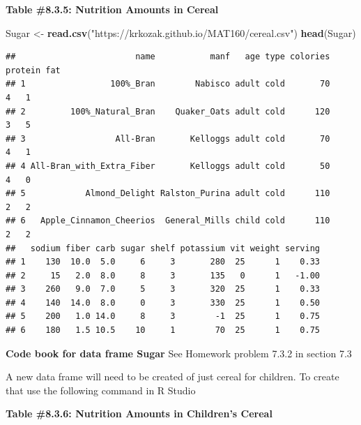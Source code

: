 \documentclass[]{book}
\newenvironment{Shaded}{\begin{snugshade}}{\end{snugshade}}
\newcommand{\KeywordTok}[1]{\textcolor[rgb]{0.13,0.29,0.53}{\textbf{#1}}}
\newcommand{\NormalTok}[1]{#1}
\newcommand{\OperatorTok}[1]{\textcolor[rgb]{0.81,0.36,0.00}{\textbf{#1}}}
\newcommand{\StringTok}[1]{\textcolor[rgb]{0.31,0.60,0.02}{#1}}
\begin{document}
\textbf{Table \#8.3.5: Nutrition Amounts in Cereal}

\begin{Shaded}
\begin{Highlighting}[]
\NormalTok{Sugar <-}\StringTok{ }\KeywordTok{read.csv}\NormalTok{(}\StringTok{"https://krkozak.github.io/MAT160/cereal.csv"}\NormalTok{)}
\KeywordTok{head}\NormalTok{(Sugar)}
\end{Highlighting}
\end{Shaded}

\begin{verbatim}
##                        name           manf   age type colories protein fat
## 1                 100%_Bran        Nabisco adult cold       70       4   1
## 2         100%_Natural_Bran    Quaker_Oats adult cold      120       3   5
## 3                  All-Bran       Kelloggs adult cold       70       4   1
## 4 All-Bran_with_Extra_Fiber       Kelloggs adult cold       50       4   0
## 5            Almond_Delight Ralston_Purina adult cold      110       2   2
## 6   Apple_Cinnamon_Cheerios  General_Mills child cold      110       2   2
##   sodium fiber carb sugar shelf potassium vit weight serving
## 1    130  10.0  5.0     6     3       280  25      1    0.33
## 2     15   2.0  8.0     8     3       135   0      1   -1.00
## 3    260   9.0  7.0     5     3       320  25      1    0.33
## 4    140  14.0  8.0     0     3       330  25      1    0.50
## 5    200   1.0 14.0     8     3        -1  25      1    0.75
## 6    180   1.5 10.5    10     1        70  25      1    0.75
\end{verbatim}

\textbf{Code book for data frame Sugar} See Homework problem 7.3.2 in section 7.3

A new data frame will need to be created of just cereal for children. To create that use the following command in R Studio

\textbf{Table \#8.3.6: Nutrition Amounts in Children's Cereal}

\begin{Shaded}
\end{Shaded}
\end{document}

